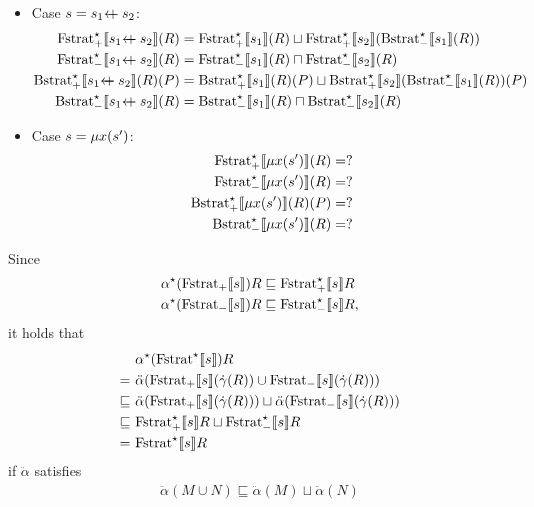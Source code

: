 \documentclass{article}
\newcommand{\leftchoice}[2]{\ensuremath #1 \mathrel{\vcenter{\hbox{+}}\mkern-18.5mu{\leftarrow}} #2}
\newcommand{\fix}[2]{\ensuremath \mu #1 (#2)}
\newcommand{\Fstratm}[1]{\ensuremath \text{Fstrat}_{-}\llbracket #1 \rrbracket}
\newcommand{\Fstratp}[1]{\ensuremath \text{Fstrat}_{+}\llbracket #1 \rrbracket}
\newcommand{\Fstrata}[1]{\ensuremath \text{Fstrat}^\star\llbracket #1 \rrbracket}
\newcommand{\Fstratam}[1]{\ensuremath \text{Fstrat}^\star_{-}\llbracket #1 \rrbracket}
\newcommand{\Fstratap}[1]{\ensuremath \text{Fstrat}^\star_{+}\llbracket #1 \rrbracket}
\newcommand{\Bstratap}[1]{\ensuremath \text{Bstrat}_{+}^\star\llbracket #1 \rrbracket}
\newcommand{\Bstratam}[1]{\ensuremath \text{Bstrat}_{-}^\star\llbracket #1 \rrbracket}
\begin{document}
\begin{itemize}
\item Case $s = \leftchoice{s_1}{s_2}$:
  \begin{align*}
    \Fstratap{\leftchoice{s_1}{s_2}}(R) &= \Fstratap{s_1}(R) \sqcup \Fstratap{s_2}(\Bstratam{s_1}(R)) \\
    \Fstratam{\leftchoice{s_1}{s_2}}(R) &= \Fstratam{s_1}(R) \sqcap \Fstratam{s_2}(R) \\
    \Bstratap{\leftchoice{s_1}{s_2}}(R)(P) &= \Bstratap{s_1}(R)(P) \sqcup \Bstratap{s_2}(\Bstratam{s_1}(R))(P) \\
    \Bstratam{\leftchoice{s_1}{s_2}}(R) &= \Bstratam{s_1}(R) \sqcap \Bstratam{s_2}(R)
  \end{align*}

\item Case $s = \fix{x}{s'}$:
  \begin{align*}
    \Fstratap{\fix{x}{s'}}(R) &= ? \\
    \Fstratam{\fix{x}{s'}}(R) &= ? \\
    \Bstratap{\fix{x}{s'}}(R)(P) &= ? \\
    \Bstratam{\fix{x}{s'}}(R) &= ?
  \end{align*}
\end{itemize}

Since
\begin{align*}
  \alpha^\star(\Fstratp{s})R &\sqsubseteq \Fstratap{s}R \\
  \alpha^\star(\Fstratm{s})R &\sqsubseteq \Fstratam{s}R,
\end{align*}
it holds that
\begin{align*}
   &\ \alpha^\star(\Fstrata{s})R \\
  =&\ \ddot{\alpha}(\Fstratp{s}(\dot{\gamma}(R)) \cup \Fstratm{s}(\dot{\gamma}(R))) \\
  \sqsubseteq&\ \ddot{\alpha}(\Fstratp{s}(\dot{\gamma}(R))) \sqcup \ddot{\alpha}(\Fstratm{s}(\dot{\gamma}(R))) \\
  \sqsubseteq&\ \Fstratap{s}R \sqcup \Fstratam{s}R \\
  =&\ \Fstrata{s}R
\end{align*}
if $\ddot{\alpha}$ satisfies
\begin{align*}
  \ddot{\alpha}(M \cup N) \sqsubseteq \ddot{\alpha}(M) \sqcup \ddot{\alpha}(N)
\end{align*}
\end{document}
